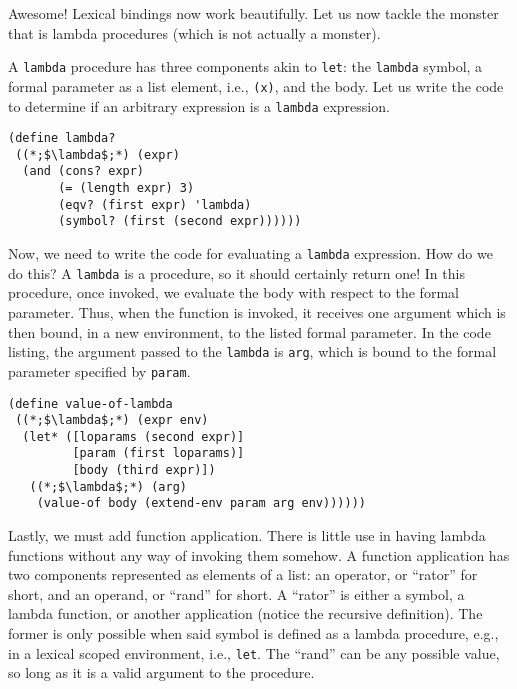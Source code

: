 Awesome! Lexical bindings now work beautifully. Let us now tackle the monster that is lambda procedures (which is not actually a monster).

A \texttt{lambda} procedure has three components akin to \texttt{let}: the \texttt{lambda} symbol, a formal parameter as a list element, i.e., \texttt{(x)}, and the body. Let us write the code to determine if an arbitrary expression is a \texttt{lambda} expression.

\begin{cl}[]{}\begin{lstlisting}[language=MyScheme]
(define lambda?
 ((*;$\lambda$;*) (expr)
  (and (cons? expr)
       (= (length expr) 3)
       (eqv? (first expr) 'lambda)
       (symbol? (first (second expr))))))
\end{lstlisting}\end{cl}

Now, we need to write the code for evaluating a \texttt{lambda} expression. How do we do this? A \texttt{lambda} is a procedure, so it should certainly return one! In this procedure, once invoked, we evaluate the body with respect to the formal parameter. Thus, when the function is invoked, it receives one argument which is then bound, in a new environment, to the listed formal parameter. In the code listing, the argument passed to the \texttt{lambda} is \texttt{arg}, which is bound to the formal parameter specified by \texttt{param}.

\begin{cl}[]{}\begin{lstlisting}[language=MyScheme]
(define value-of-lambda
 ((*;$\lambda$;*) (expr env)
  (let* ([loparams (second expr)]
         [param (first loparams)]
         [body (third expr)])
   ((*;$\lambda$;*) (arg)
    (value-of body (extend-env param arg env))))))
\end{lstlisting}\end{cl}

Lastly, we must add function application. There is little use in having lambda functions without any way of invoking them somehow. A function application has two components represented as elements of a list: an operator, or ``rator'' for short, and an operand, or ``rand'' for short. A ``rator'' is either a symbol, a lambda function, or another application (notice the recursive definition). The former is only possible when said symbol is defined as a lambda procedure, e.g., in a lexical scoped environment, i.e., \texttt{let}. The ``rand'' can be any possible value, so long as it is a valid argument to the procedure.

